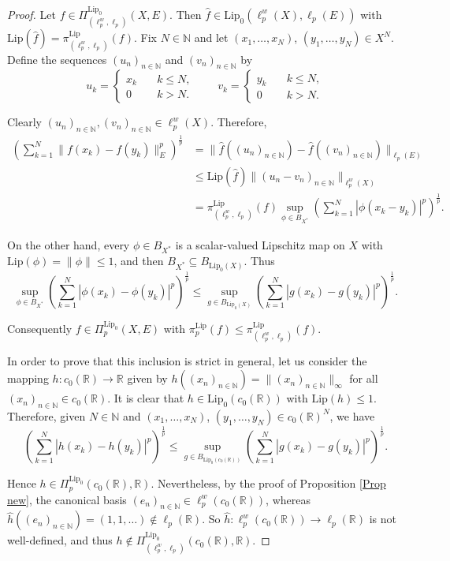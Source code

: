 \documentclass[12pt]{amsart}
\def\R{\mathbb{R}}
\def\N{\mathbb{N}}
\def\Lip{\mathrm{Lip}_0}
\def\Lipnorm{\mathrm{Lip}}
\begin{document}
\begin{proof}
	Let $f \in \Pi_{(\ell_p^w,\ell_p)}^{\Lip}(X,E)$. Then $\hat{f} \in \Lip(\ell_p^w(X),\ell_p(E))$ with $\Lipnorm(\hat{f}) = \pi_{(\ell_p^w,\ell_p)}^{\Lipnorm}(f)$. Fix $N \in \N$ and let $(x_1,\ldots,x_N)$, $(y_1,\ldots,y_N)\in X^N$. Define the sequences $(u_n)_{n\in\N}$ and $(v_n)_{n\in\N}$ by
	$$
	u_k = \begin{cases}
		x_k \quad &k \leq N,\\
		0 \quad &k > N.
	\end{cases} \qquad
	v_k = \begin{cases}
		y_k \quad &k \leq N,\\
		0 \quad &k > N.
	\end{cases}
	$$

	Clearly $(u_n)_{n\in\N}, (v_n)_{n\in\N} \in \ell_p^w(X)$. Therefore,
	\begin{align*}
		\left(\sum_{k=1}^N \|f(x_k)-f(y_k)\|_E^p \right)^{\frac{1}{p}} &= \|\hat{f}((u_n)_{n\in\N})-\hat{f}((v_n)_{n\in\N})\|_{\ell_p(E)}\\
		&\leq \Lipnorm(\hat{f})\|(u_n-v_n)_{n\in\N}\|_{\ell_p^w(X)}\\
		&= \pi_{(\ell_p^w,\ell_p)}^{\Lipnorm}(f) \sup_{\phi \in B_{X^*}} \left(\sum_{k=1}^N |\phi(x_k-y_k)|^p \right)^{\frac{1}{p}}.
	\end{align*}

	On the other hand, every $\phi \in B_{X^*}$ is a scalar-valued Lipschitz map on $X$ with $\Lipnorm(\phi) = \|\phi\| \leq 1$, and then $B_{X^*} \subseteq B_{\Lip(X)}$. Thus
	$$
	\sup_{\phi \in B_{X^*}}\left( \sum_{k=1}^{N} |\phi(x_k)-\phi(y_k)|^p \right)^{\frac{1}{p}} \leq \sup_{g \in B_{\Lip(X)}} \left( \sum_{k=1}^{N} |g(x_k)-g(y_k)|^p \right)^{\frac{1}{p}}.
	$$

	Consequently $f \in \Pi_p^{\Lip}(X,E)$ with $\pi_p^{\Lipnorm}(f) \leq \pi_{(\ell_p^w,\ell_p)}^{\Lipnorm}(f)$.

	In order to prove that this inclusion is strict in general, let us consider the mapping $h: c_0(\R) \to \R$ given by $h((x_n)_{n\in\N})=\|(x_n)_{n\in\N}\|_\infty$ for all $(x_n)_{n\in\N} \in c_0(\R)$. It is clear that $h \in \Lip(c_0(\R))$ with $\Lipnorm(h) \leq 1$. Therefore, given $N \in \N$ and $(x_1,\ldots,x_N)$, $(y_1,\ldots,y_N) \in c_0(\R)^N$, we have
	$$
	\left( \sum_{k=1}^{N}|h(x_k)-h(y_k)|^p \right)^{\frac{1}{p}} \leq \sup_{g \in B_{\Lip(c_0(\R))}} \left( \sum_{k=1}^{N} |g(x_k)-g(y_k)|^p \right)^{\frac{1}{p}}.
	$$

	Hence $h \in \Pi_p^{\Lip}(c_0(\R),\R)$. Nevertheless, by the proof of Proposition \ref{Prop new}, the canonical basis $(e_n)_{n\in\N} \in \ell_p^w(c_0(\R))$, whereas $\hat{h}((e_n)_{n\in\N}) = (1,1,\ldots) \notin \ell_p(\R)$. So $\hat{h}: \ell_p^w(c_0(\R)) \to \ell_p(\R)$ is not well-defined,  and thus $h \notin \Pi_{(\ell_p^w,\ell_p)}^{\Lip}(c_0(\R),\R)$.


\end{proof}
\end{document}
